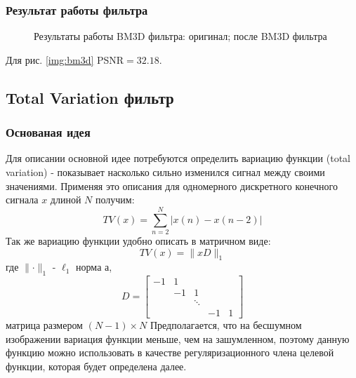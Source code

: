 \subsubsection{Результат работы фильтра}

\begin{figure}[H]
	\centering
	\hspace{0.0125ex}
	\subfigure[]{\texttt{[image: bm3d]}
		\label{img:bm3d}
	}
	\caption{Результаты работы BM3D фильтра:  оригинал;  после BM3D фильтра}
	\label{img:bm3dRes}
\end{figure}
Для рис. \ref{img:bm3d} PSNR$=32.18$.

\subsection{Total Variation фильтр}
\subsubsection{Основаная идея}
Для описании основной идее потребуются определить вариацию функции (total variation) - показывает насколько сильно изменился сигнал между своими значениями. Применяя это описания для одномерного дискретного конечного сигнала $x$ длиной $N$ получим: 
\begin{equation}\label{eq:TV}
TV(x)=\sum_{n=2}^N|x(n) - x(n-2)|
\end{equation}
Так же вариацию функции удобно описать в матричном виде:
\begin{equation}\label{eq:TV:m}
	TV(x) = \parallel xD\parallel_1
\end{equation}
где $\parallel  \cdot  \parallel_1$ - $\ell_1$  норма а,
\begin{equation}\label{eq:TV:matrix}
D = \left[
\begin{array}{ccccc}
-1 & 1 & & & \\
 & -1 &  1& & \\
 & & \ddots & & \\
 &  &  & -1  & 1 
\end{array}
\right]
\end{equation}
матрица размером $(N-1)\times N$
Предполагается, что на бесшумном изображении вариация функции меньше, чем на зашумленном, поэтому данную функцию можно использовать в качестве регуляризационного члена целевой функции, которая будет определена далее.
